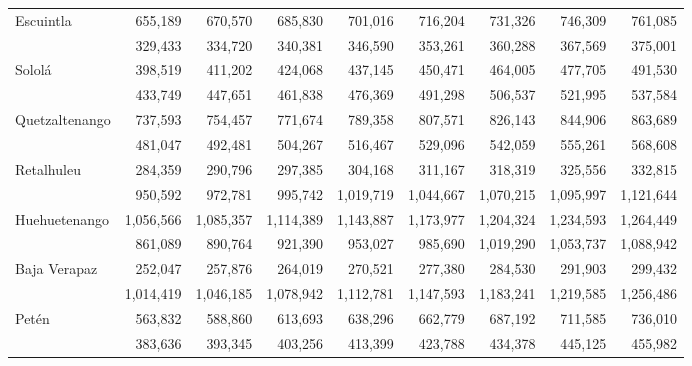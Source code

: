 {\begin{center}
\begin{tabular}{lrrrrrrrr}
			\multicolumn{1}{l}{Escuintla}	&	 655,189 	&	 670,570 	&	 685,830 	&	 701,016 	&	 716,204 	&	 731,326 	&	 746,309 	&	 761,085 	\\
			\rowcolor{color1!10!white} \multicolumn{1}{l}{Santa Rosa}	&	 329,433 	&	 334,720 	&	 340,381 	&	 346,590 	&	 353,261 	&	 360,288 	&	 367,569 	&	 375,001 	\\
			\multicolumn{1}{l}{Sololá}	&	 398,519 	&	 411,202 	&	 424,068 	&	 437,145 	&	 450,471 	&	 464,005 	&	 477,705 	&	 491,530 	\\
			\rowcolor{color1!10!white} \multicolumn{1}{l}{Totonicapán}	&	 433,749 	&	 447,651 	&	 461,838 	&	 476,369 	&	 491,298 	&	 506,537 	&	 521,995 	&	 537,584 	\\
			\multicolumn{1}{l}{Quetzaltenango}	&	 737,593 	&	 754,457 	&	 771,674 	&	 789,358 	&	 807,571 	&	 826,143 	&	 844,906 	&	 863,689 	\\
		\rowcolor{color1!10!white} \multicolumn{1}{l}{Suchitepéquez}	&	 481,047 	&	 492,481 	&	 504,267 	&	 516,467 	&	 529,096 	&	 542,059 	&	 555,261 	&	 568,608 	\\
			\multicolumn{1}{l}{Retalhuleu}	&	 284,359 	&	 290,796 	&	 297,385 	&	 304,168 	&	 311,167 	&	 318,319 	&	 325,556 	&	 332,815 	\\
			\rowcolor{color1!10!white} \multicolumn{1}{l}{San Marcos}	&	 950,592 	&	 972,781 	&	 995,742 	&	 1,019,719 	&	 1,044,667 	&	 1,070,215 	&	 1,095,997 	&	 1,121,644 	\\
			\multicolumn{1}{l}{Huehuetenango}	&	 1,056,566 	&	 1,085,357 	&	 1,114,389 	&	 1,143,887 	&	 1,173,977 	&	 1,204,324 	&	 1,234,593 	&	 1,264,449 	\\
			\rowcolor{color1!10!white} \multicolumn{1}{l}{Quiché}	&	 861,089 	&	 890,764 	&	 921,390 	&	 953,027 	&	 985,690 	&	 1,019,290 	&	 1,053,737 	&	 1,088,942 	\\
			\multicolumn{1}{l}{Baja Verapaz}	&	 252,047 	&	 257,876 	&	 264,019 	&	 270,521 	&	 277,380 	&	 284,530 	&	 291,903 	&	 299,432 	\\
			\rowcolor{color1!10!white} \multicolumn{1}{l}{Alta Verapaz}	&	 1,014,419 	&	 1,046,185 	&	 1,078,942 	&	 1,112,781 	&	 1,147,593 	&	 1,183,241 	&	 1,219,585 	&	 1,256,486 	\\
			\multicolumn{1}{l}{Petén}	&	 563,832 	&	 588,860 	&	 613,693 	&	 638,296 	&	 662,779 	&	 687,192 	&	 711,585 	&	 736,010 	\\
			\rowcolor{color1!10!white} \multicolumn{1}{l}{Izabal}	&	 383,636 	&	 393,345 	&	 403,256 	&	 413,399 	&	 423,788 	&	 434,378 	&	 445,125 	&	 455,982 	\\

\end{tabular}
\end{center}}
